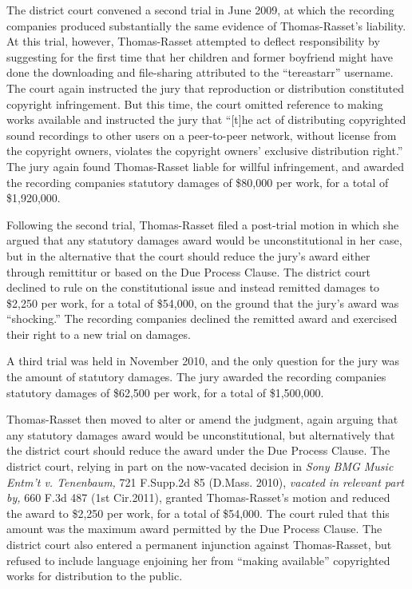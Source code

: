 The district court convened a second trial in June 2009, at which the recording
companies produced substantially the same evidence of Thomas-Rasset's
liability. At this trial, however, Thomas-Rasset attempted to deflect
responsibility by suggesting for the first time that her children and former
boyfriend might have done the downloading and file-sharing attributed to the
``tereastarr'' username. The court again instructed the jury that reproduction
or distribution constituted copyright infringement. But this time, the court
omitted reference to making works available and instructed the jury that
``[t]he act of distributing copyrighted sound recordings to other users on a
peer-to-peer network, without license from the copyright owners, violates the
copyright owners' exclusive distribution right.'' The jury again found
Thomas-Rasset liable for willful infringement, and awarded the recording
companies statutory damages of \$80,000 per work, for a total of \$1,920,000.

Following the second trial, Thomas-Rasset filed a post-trial motion in which she
argued that any statutory damages award would be unconstitutional in her case,
but in the alternative that the court should reduce the jury's award either
through remittitur or based on the Due Process Clause. The district court
declined to rule on the constitutional issue and instead remitted damages to
\$2,250 per work, for a total of \$54,000, on the ground that the jury's award
was ``shocking.'' The recording companies declined the remitted award and
exercised their right to a new trial on damages.

A third trial was held in November 2010, and the only question for the jury was
the amount of statutory damages. The jury awarded the recording companies
statutory damages of \$62,500 per work, for a total of \$1,500,000.

Thomas-Rasset then moved to alter or amend the judgment, again arguing that any
statutory damages award would be unconstitutional, but alternatively that the
district court should reduce the award under the Due Process Clause. The
district court, relying in part on the now-vacated decision in \textit{Sony BMG
Music Entm't v. Tenenbaum,} 721 F.Supp.2d 85 (D.Mass. 2010), \textit{vacated in
relevant part by,} 660 F.3d 487 (1st Cir.2011), granted Thomas-Rasset's motion
and reduced the award to \$2,250 per work, for a total of \$54,000. The court
ruled that this amount was the maximum award permitted by the Due Process
Clause. The district court also entered a permanent injunction against
Thomas-Rasset, but refused to include language enjoining her from ``making
available'' copyrighted works for distribution to the public.

